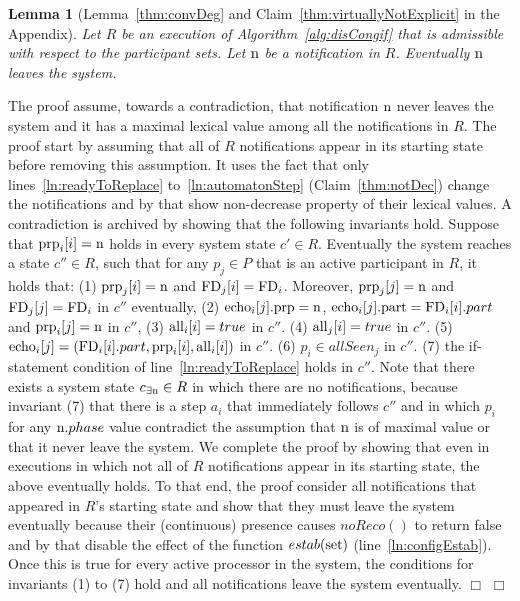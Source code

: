 \documentclass[11pt]{article}
\newcommand{\noReconfig}{noReco}
\newcommand{\configEstab}{estab}
\newcommand{\notif}{prp}
\newtheorem{lemma}[theorem]{Lemma}
\newenvironment{proofsketch}{\noindent{\bf Proof Sketch.}}{\hfill$\Box$}
\begin{document}
{\begin{proofsketch}
\begin{lemma}[Lemma~\ref{thm:convDeg} and Claim~\ref{thm:virtuallyNotExplicit} in the Appendix]
\label{thm:convDegShort}
Let $R$ be an execution of Algorithm~\ref{alg:disCongif} that is admissible with respect to the participant sets. 
Let $\textnormal{n}$ be a notification in $R$. Eventually $\textnormal{n}$ leaves the system.
\end{lemma}
\begin{proofsketch}
The proof assume, towards a contradiction, that notification $\textnormal{n}$ never leaves the system and it has a maximal lexical value among all the notifications in $R$. The proof start by assuming that all of $R$ notifications appear in its starting state before removing this assumption. It uses the fact that only lines~\ref{ln:readyToReplace} to~\ref{ln:automatonStep} (Claim~\ref{thm:notDec}) change the notifications and by that show non-decrease property of their lexical values. A contradiction is archived by showing that the following invariants hold.  
Suppose that $\textnormal{\notif}_i[i] = \textnormal{n}$ holds in  every system state $c' \in R$. Eventually the system reaches a state $c'' \in R$, such that for any $p_j \in P$ that is an active participant in $R$, it holds that:
(1) $\textnormal{\notif}_j[i] = \textnormal{n}$ and $\textnormal{FD}_j[i] = \textnormal{FD}_i$. Moreover, $\textnormal{\notif}_j[j]=\textnormal{n}$ and $\textnormal{FD}_j[j] = \textnormal{FD}_i$ in $c''$ eventually,
(2) $\textnormal{echo}_i[j].\textnormal{\notif} = \textnormal{n}$, $\textnormal{echo}_i[j].\textnormal{part} = \textnormal{FD}_i[i].part$ and $\textnormal{\notif}_i[j]=\textnormal{n}$  in $c''$,
(3) $\textnormal{all}_i[i] = true$  in $c''$.
(4) $\textnormal{all}_j[i] = true$  in $c''$. 
(5) $\textnormal{echo}_i[j] = (\textnormal{FD}_i[i].part, \textnormal{\notif}_i[i], \textnormal{all}_i[i])$ in $c''$. 
(6) $p_i \in allSeen_j$  in $c''$. 
(7) the if-statement condition of line~\ref{ln:readyToReplace} holds in $c''$.
Note that there exists a system state
$c_{\exists \textnormal{n}} \in R$ in which there are no notifications, because invariant (7) that there is a step $a_i$ that immediately follows $c''$ and in which $p_i$ for any $\textnormal{n}.phase$ value contradict the assumption that $\textnormal{n}$ is of maximal value or that it never leave the system. We complete the proof by showing that even in executions in which not all of $R$ notifications appear in its starting state, the above eventually holds. To that end, the proof consider all notifications that appeared in $R$'s starting state and show that they must leave the system eventually because their (continuous) presence causes $\noReconfig()$ to return false and by that disable the effect of the function $\configEstab(\textnormal{set})$ (line~\ref{ln:configEstab}). Once this is true for every active processor in the system, the conditions for invariants (1) to (7) hold and all notifications leave the system eventually.   
\hfill\end{proofsketch}
\end{proofsketch}

}
\end{document}
